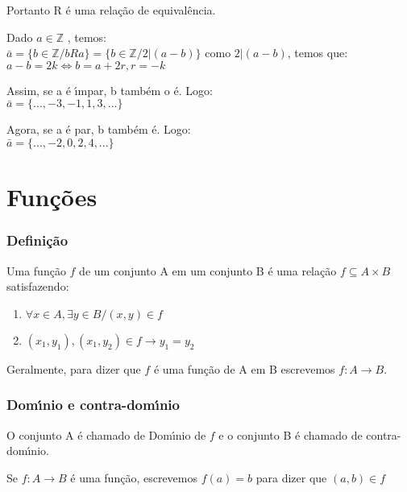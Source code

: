 Portanto R {\'e} uma rela{\c c}{\~a}o de equival{\^e}ncia.

Dado $a\in\mathbb{Z}$ , temos:\\
$\bar{a}=\{b\in\mathbb{Z}/bRa\}=\{b\in\mathbb{Z}/2|(a-b)\}$ como $2|(a-b)$, temos que:\\
$a-b=2k\Leftrightarrow b=a+2r, r=-k$

Assim, se a {\'e} {\'\i}mpar, b tamb{\'e}m o {\'e}. Logo:\\
$\bar{a}=\{...,-3,-1,1,3,...\}$

Agora, se a {\'e} par, b tamb{\'e}m {\'e}. Logo:\\
$\bar{a}=\{...,-2,0,2,4,...\}$

\section{Fun{\c c}{\~o}es}

\subsubsection{Defini{\c c}{\~a}o}
\begin{definicao}[Fun{\c c}{\~a}o] Uma fun{\c c}{\~a}o $f$ de um conjunto A em um conjunto B {\'e} uma rela{\c c}{\~a}o $f\subseteq A\times B$ satisfazendo:
\begin{enumerate}
\item $\forall x\in A,\exists y\in B/(x,y)\in f$
\item $(x_{1},y_{1}),(x_{1},y_{2})\in f \rightarrow y_{1}=y_{2}$
\end{enumerate}
\end{definicao}

Geralmente, para dizer que $f$ {\'e} uma fun{\c c}{\~a}o de A em B escrevemos $f:A\rightarrow B$.

\subsubsection{Dom{\'\i}nio e contra-dom{\'\i}nio}
O conjunto A {\'e} chamado de Dom{\'\i}nio de $f$ e o conjunto B {\'e} chamado de contra-dom{\'\i}nio.

Se $f:A\rightarrow B$ {\'e} uma fun{\c c}{\~a}o, escrevemos $f(a)=b$ para dizer que $(a,b)\in f$

